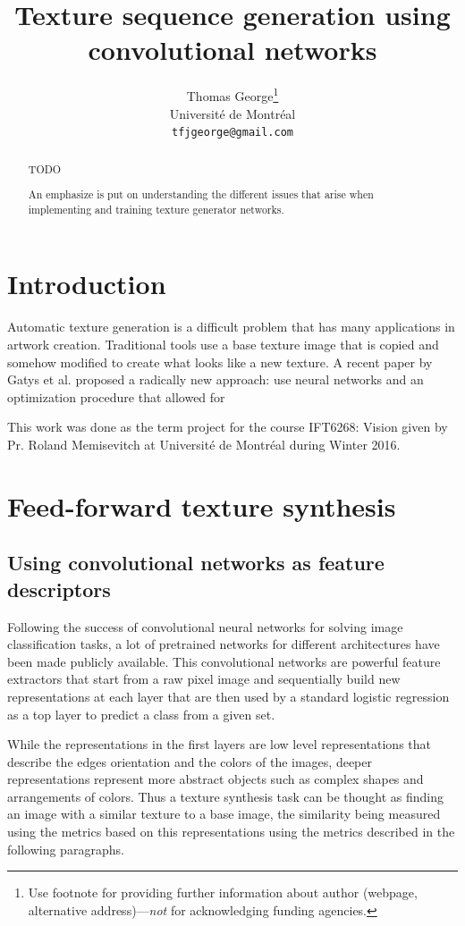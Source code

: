 \documentclass{article}
\title{Texture sequence generation using convolutional networks}
\author{
  Thomas George\thanks{Use footnote for providing further
    information about author (webpage, alternative
    address)---\emph{not} for acknowledging funding agencies.} \\
  Université de Montréal\\
  \texttt{tfjgeorge@gmail.com} \\
}
\begin{document}

\maketitle

\begin{abstract}
  TODO
  
  An emphasize is put on understanding the different issues that arise when implementing and training texture generator networks.
\end{abstract}

\section{Introduction}

Automatic texture generation is a difficult problem that has many applications in artwork creation. Traditional tools use a base texture image that is copied and somehow modified to create what looks like a new texture. A recent paper by Gatys et al. proposed a radically new approach: use neural networks and an optimization procedure that allowed for 

This work was done as the term project for the course IFT6268: Vision given by Pr. Roland Memisevitch at Université de Montréal during Winter 2016.

\section{Feed-forward texture synthesis}

\subsection{Using convolutional networks as feature descriptors}

Following the success of convolutional neural networks for solving image classification tasks, a lot of pretrained networks for different architectures have been made publicly available. This convolutional networks are powerful feature extractors that start from a raw pixel image and sequentially build new representations at each layer that are then used by a standard logistic regression as a top layer to predict a class from a given set.

While the representations in the first layers are low level representations that describe the edges orientation and the colors of the images, deeper representations represent more abstract objects such as complex shapes and arrangements of colors. Thus a texture synthesis task can be thought as finding an image with a similar texture to a base image, the similarity being measured using the metrics based on this representations using the metrics described in the following paragraphs.
\end{document}
